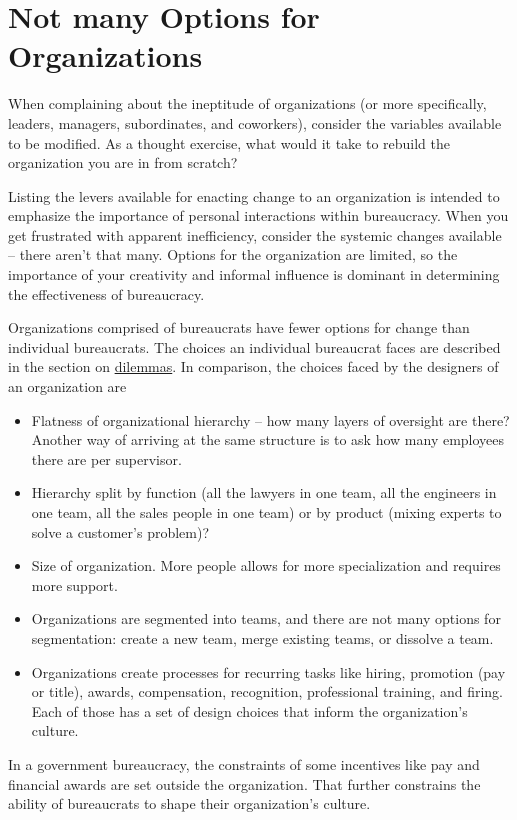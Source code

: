 \section{Not many Options for Organizations}

When complaining about the ineptitude of organizations (or more specifically, leaders, managers, subordinates, and coworkers), consider the variables available to be modified. As a thought exercise, what would it take to rebuild the organization you are in from scratch? 

Listing the levers available for enacting change to an organization is intended to emphasize the importance of personal interactions within bureaucracy. When you get frustrated with apparent inefficiency, consider the systemic changes available -- there aren't that many. Options for the organization are limited, so the importance of your creativity and informal influence is dominant in determining the effectiveness of bureaucracy.

Organizations comprised of bureaucrats have fewer options for change than individual bureaucrats. The choices an individual bureaucrat faces are described in the section on 
\hyperref[sec:dilemma-trilemma]{dilemmas}.
In comparison, the choices faced by the designers of an organization are
\begin{itemize}
    \item Flatness of organizational hierarchy -- how many layers of oversight are there? Another way of arriving at the same structure is to ask how many employees there are per supervisor.
    \item Hierarchy split by function (all the lawyers in one team, all the engineers in one team, all the sales people in one team) or by product (mixing experts to solve a customer's problem)?
    \item Size of organization. More people allows for more specialization and requires more support. 
    \item Organizations are segmented into teams, and there are not many options for segmentation: create a new team, merge existing teams, or dissolve a team.
    \item Organizations create processes for recurring tasks like hiring, promotion (pay or title), awards, compensation, recognition, professional training, and firing. Each of those has a set of design choices that inform the organization's culture.
\end{itemize}
In a government bureaucracy, the constraints of some incentives like pay and financial awards are set outside the organization. That further constrains the ability of bureaucrats to shape their organization's culture.

